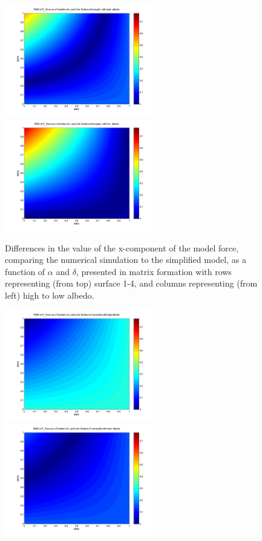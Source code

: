 \begin{description}
\begin{figure}[!ht]
\begin{minipage}[t]{200mm}
    \includegraphics[width=65mm]{figs/sda/F_x_error_albedo__med_surf__rough.jpg}
    \includegraphics[width=65mm]{figs/sda/F_x_error_albedo__low_surf__rough.jpg}
  \end{minipage}
    \caption{Differences in the value of the x-component of the model force, comparing the
    numerical simulation to
    the simplified model, as a function of $\alpha$ and $\delta$,
    presented in matrix formation with rows representing (from top) surface
    1-4, and columns representing (from left) high to low albedo.}
    \label{fig:ivv_sda_alpha_delta_Fx}
  \end{figure}
  \begin{figure}[!ht]
  \leftskip=-20mm
  \begin{minipage}[t]{200mm}\centering
    \includegraphics[width=65mm]{figs/sda/F_z_error_albedo_high_surf_smooth.jpg}
    \includegraphics[width=65mm]{figs/sda/F_z_error_albedo__med_surf_smooth.jpg}

\end{minipage}
\end{figure}
\end{description}
